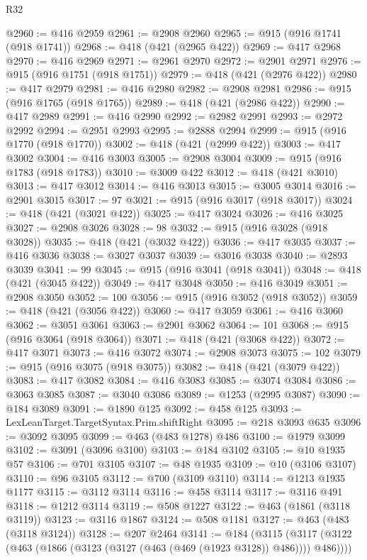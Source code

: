 \begin{lexlean}{R32}
\begin{coremodule}
@2960 := @416 @2959
@2961 := @2908 @2960
@2965 := @915 (@916 @1741 (@918 @1741))
@2968 := @418 (@421 (@2965 @422))
@2969 := @417 @2968
@2970 := @416 @2969
@2971 := @2961 @2970
@2972 := @2901 @2971
@2976 := @915 (@916 @1751 (@918 @1751))
@2979 := @418 (@421 (@2976 @422))
@2980 := @417 @2979
@2981 := @416 @2980
@2982 := @2908 @2981
@2986 := @915 (@916 @1765 (@918 @1765))
@2989 := @418 (@421 (@2986 @422))
@2990 := @417 @2989
@2991 := @416 @2990
@2992 := @2982 @2991
@2993 := @2972 @2992
@2994 := @2951 @2993
@2995 := @2888 @2994
@2999 := @915 (@916 @1770 (@918 @1770))
@3002 := @418 (@421 (@2999 @422))
@3003 := @417 @3002
@3004 := @416 @3003
@3005 := @2908 @3004
@3009 := @915 (@916 @1783 (@918 @1783))
@3010 := @3009 @422
@3012 := @418 (@421 @3010)
@3013 := @417 @3012
@3014 := @416 @3013
@3015 := @3005 @3014
@3016 := @2901 @3015
@3017 := 97
@3021 := @915 (@916 @3017 (@918 @3017))
@3024 := @418 (@421 (@3021 @422))
@3025 := @417 @3024
@3026 := @416 @3025
@3027 := @2908 @3026
@3028 := 98
@3032 := @915 (@916 @3028 (@918 @3028))
@3035 := @418 (@421 (@3032 @422))
@3036 := @417 @3035
@3037 := @416 @3036
@3038 := @3027 @3037
@3039 := @3016 @3038
@3040 := @2893 @3039
@3041 := 99
@3045 := @915 (@916 @3041 (@918 @3041))
@3048 := @418 (@421 (@3045 @422))
@3049 := @417 @3048
@3050 := @416 @3049
@3051 := @2908 @3050
@3052 := 100
@3056 := @915 (@916 @3052 (@918 @3052))
@3059 := @418 (@421 (@3056 @422))
@3060 := @417 @3059
@3061 := @416 @3060
@3062 := @3051 @3061
@3063 := @2901 @3062
@3064 := 101
@3068 := @915 (@916 @3064 (@918 @3064))
@3071 := @418 (@421 (@3068 @422))
@3072 := @417 @3071
@3073 := @416 @3072
@3074 := @2908 @3073
@3075 := 102
@3079 := @915 (@916 @3075 (@918 @3075))
@3082 := @418 (@421 (@3079 @422))
@3083 := @417 @3082
@3084 := @416 @3083
@3085 := @3074 @3084
@3086 := @3063 @3085
@3087 := @3040 @3086
@3089 := @1253 (@2995 @3087)
@3090 := @184 @3089
@3091 := @1890 @125
@3092 := @458 @125
@3093 := LexLeanTarget.TargetSyntax.Prim.shiftRight
@3095 := @218 @3093 @635
@3096 := @3092 @3095
@3099 := @463 (@483 @1278) @486
@3100 := @1979 @3099
@3102 := @3091 (@3096 @3100)
@3103 := @184 @3102
@3105 := @10 @1935 @57
@3106 := @701 @3105
@3107 := @48 @1935
@3109 := @10 (@3106 @3107)
@3110 := @96 @3105
@3112 := @700 (@3109 @3110)
@3114 := @1213 @1935 @1177
@3115 := @3112 @3114
@3116 := @458 @3114
@3117 := @3116 @491
@3118 := @1212 @3114
@3119 := @508 @1227
@3122 := @463 (@1861 (@3118 @3119))
@3123 := @3116 @1867
@3124 := @508 @1181
@3127 := @463 (@483 (@3118 @3124))
@3128 := @207 @2464
@3141 := @184
    (@3115 (@3117 (@3122 (@463 (@1866 (@3123 (@3127 (@463 (@469 (@1923 @3128)) @486)))) @486))))

\end{coremodule}
\end{lexlean}
